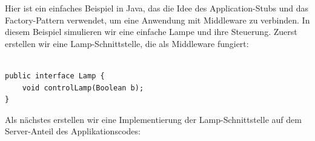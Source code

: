 \documentclass[../vs-script-first-v01.tex]{subfiles}
\begin{document}
Hier ist ein einfaches Beispiel in Java, das die Idee des Application-Stubs und das Factory-Pattern verwendet, um eine Anwendung mit Middleware zu verbinden. In diesem Beispiel simulieren wir eine einfache Lampe und ihre Steuerung.
Zuerst erstellen wir eine Lamp-Schnittstelle, die als Middleware fungiert:\\\\
\noindent\begin{minipage}{\textwidth}
\begin{lstlisting}[caption={RPC Interface},captionpos=b,label={lst:rpc-interface}]
public interface Lamp {
    void controlLamp(Boolean b);
}
\end{lstlisting}
\end{minipage}
Als nächstes erstellen wir eine Implementierung der Lamp-Schnittstelle auf dem Server-Anteil des Applikationscodes:\\\\
\end{document}
